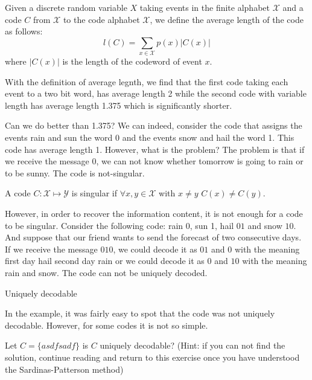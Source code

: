 \begin{definition}
Given a discrete random variable $X$ taking events in the finite alphabet $\mathcal X$ and a code $C$ from $\mathcal X$ to the code alphabet $\mathcal X$, we define the average length of the code as follows:
\begin{equation}
l(C)=\sum_{x\in\mathcal X}p(x)|C(x)|
\end{equation}
where $|C(x)|$ is the length of the codeword of event $x$.
\end{definition}
\begin{exercise}
With the definition of average legnth, we find that the first code taking each event to a two bit word, has average length 2 while the second code with variable length has average length 1.375 which is significantly shorter. 
\end{exercise}

Can we do better than 1.375? We can indeed, consider the code that assigns the events rain and sun the word 0 and the events snow and hail the word 1. 
This code has average length 1. 
However, what is the problem? 
The problem is that if we receive the message 0, we can not know whether tomorrow is going to rain or to be sunny. 
The code is not-singular.

\begin{definition}
A code $C:\mathcal X\mapsto\mathcal Y$ is singular if $\forall x,y\in\mathcal X$ with $x\neq y$ $C(x)\neq C(y)$.
\end{definition}

However, in order to recover the information content, it is not enough for a code to be singular. Consider the following code: rain 0, sun 1, hail $01$ and snow $10$. 
And suppose that our friend wants to send the forecast of two consecutive days. 
If we receive the message $010$, we could decode it as $01$ and $0$ with the meaning first day hail second day rain or we could decode it as $0$ and $10$ with the meaning rain and snow.
The code can not be uniquely decoded.

\begin{definition}
Uniquely decodable
\end{definition}

In the example, it was fairly easy to spot that the code was not uniquely decodable. However, for some codes it is not so simple.
\begin{exercise}
Let $C=\{asdfsadf\}$ is $C$ uniquely decodable? (Hint: if you can not find the solution, continue reading and return to this exercise once you have understood the Sardinas-Patterson method)
\end{exercise}

